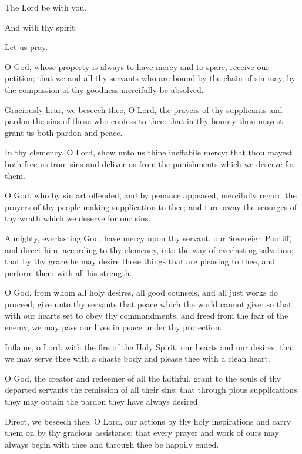 {

\noindent	\vv The Lord be with you.
	
\noindent \rr And with thy spirit.

Let us pray.

\noindent O God, whose property is always to have mercy and to spare, receive our petition; that we and all thy servants who are bound by the chain of sin may, by the compassion of thy goodness mercifully be absolved.

\noindent Graciously hear, we beseech thee, O Lord, the prayers of thy supplicants and pardon the sins of those who confess to thee: that in thy bounty thou mayest grant us both pardon and peace.

\noindent In thy clemency, O Lord, show unto us thine ineffabile mercy; that thou mayest both free us from sins and deliver us from the punishments which we deserve for them.

\noindent O God, who by sin art offended, and by penance appeased, mercifully regard the prayers of thy people making supplication to thee; and turn away the scourges of thy wrath which we deserve for our sins.

\noindent Almighty, everlasting God, have mercy upon thy servant, \nomen{} our Sovereign Pontiff, and direct him, according to thy clemency, into the way of everlasting salvation; that by thy grace he may desire those things that are pleasing to thee, and perform them with all his strength.

\noindent O God, from whom all holy desires, all good counsels, and all just works do proceed; give unto thy servants that peace which the world cannot give; so that, with our hearts set to obey thy commandments, and freed from the fear of the enemy, we may pass our lives in peace under thy protection.

\noindent Inflame, o Lord, with the fire of the Holy Spirit, our hearts and our desires; that we may serve thee with a chaste body and please thee with a clean heart.

\noindent O God, the creator and redeemer of all the faithful, grant to the souls of thy departed servants the remission of all their sins; that through pious supplications they may obtain the pardon they have always desired.

\noindent Direct, we beseech thee, O Lord, our actions by thy holy inspirations and carry them on by thy gracious assistance; that every prayer and work of ours may always begin with thee and through thee be happily ended.

}
